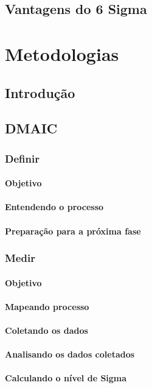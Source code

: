 \documentclass{abnt}
\begin{document}
		\section {Vantagens do 6 Sigma}
				
	\chapter {Metodologias}
		\section {Introdução}
			\section {DMAIC}
				\subsection {Definir}
					\subsubsection {Objetivo}
					\subsubsection {Entendendo o processo}
					\subsubsection {Preparação para a próxima fase}
				\subsection {Medir}
					\subsubsection {Objetivo}
					\subsubsection {Mapeando processo}
					\subsubsection {Coletando os dados}
					\subsubsection {Analisando os dados coletados}
					\subsubsection {Calculando o nível de Sigma}
\end{document}
